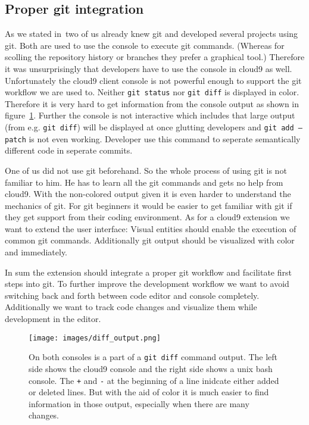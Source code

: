 \subsection{Proper git integration}
As we stated in~ two of us already knew git and developed several projects using git.
Both are used to use the console to execute git commands.
(Whereas for scolling the repository history or branches they prefer a graphical tool.)
Therefore it was unsurprisingly that developers have to use the console in cloud9 as well.
Unfortunately the cloud9 client console is not powerful enough to support the git workflow we are used to.
Neither \texttt{git status} nor \texttt{git diff} is displayed in color.
Therefore it is very hard to get information from the console output as shown in figure~\ref{fig:diff_output}.
Further the console is not interactive which includes that large output (from e.g. \texttt{git diff}) will be displayed at once glutting developers and \texttt{git add --patch} is not even working.
Developer use this command to seperate semantically different code in seperate commits.

One of us did not use git beforehand.
So the whole process of using git is not familiar to him.
He has to learn all the git commands and gets no help from cloud9.
With the non-colored output given it is even harder to understand the mechanics of git.
For git beginners it would be easier to get familiar with git if they get support from their coding environment.
As for a cloud9 extension we want to extend the user interface: 
Visual entities should enable the execution of common git commands.
Additionally git output should be visualized with color and immediately.

In sum the extension should integrate a proper git workflow and facilitate first steps into git.
To further improve the development workflow we want to avoid switching back and forth between code editor and console completely.
Additionally we want to track code changes and visualize them while development in the editor.

\begin{figure}
   \centering
   \texttt{[image: images/diff\_output.png]}
   \caption{On both consoles is a part of a \texttt{git diff} command output.
   The left side shows the cloud9 console and the right side shows a unix bash console.
   The \texttt{+} and \texttt{-} at the beginning of a line inidcate either added or deleted lines.
   But with the aid of color it is much easier to find information in those output, especially when there are many changes.}
   \label{fig:diff_output}
\end{figure}


